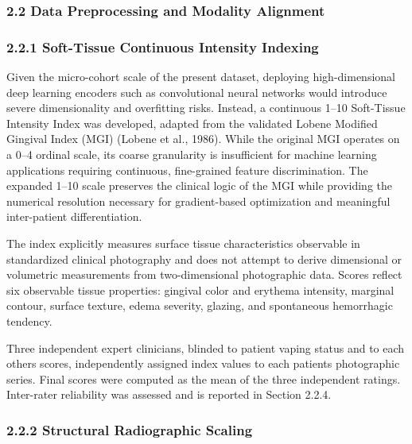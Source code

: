 \documentclass[
]{article}
\begin{document}
\subsubsection{\texorpdfstring{\textbf{2.2 Data Preprocessing and
Modality
Alignment}}{2.2 Data Preprocessing and Modality Alignment}}\label{data-preprocessing-and-modality-alignment}

\subsubsection{\texorpdfstring{\textbf{2.2.1 Soft-Tissue Continuous
Intensity
Indexing}}{2.2.1 Soft-Tissue Continuous Intensity Indexing}}\label{soft-tissue-continuous-intensity-indexing}

Given the micro-cohort scale of the present dataset, deploying
high-dimensional deep learning encoders such as convolutional neural
networks would introduce severe dimensionality and overfitting risks.
Instead, a continuous 1--10 Soft-Tissue Intensity Index was developed,
adapted from the validated Lobene Modified Gingival Index (MGI) (Lobene
et al., 1986). While the original MGI operates on a 0--4 ordinal scale,
its coarse granularity is insufficient for machine learning applications
requiring continuous, fine-grained feature discrimination. The expanded
1--10 scale preserves the clinical logic of the MGI while providing the
numerical resolution necessary for gradient-based optimization and
meaningful inter-patient differentiation.

The index explicitly measures surface tissue characteristics observable
in standardized clinical photography and does not attempt to derive
dimensional or volumetric measurements from two-dimensional photographic
data. Scores reflect six observable tissue properties: gingival color
and erythema intensity, marginal contour, surface texture, edema
severity, glazing, and spontaneous hemorrhagic tendency.

Three independent expert clinicians, blinded to patient vaping status
and to each other\textquotesingle s scores, independently assigned index
values to each patient\textquotesingle s photographic series. Final
scores were computed as the mean of the three independent ratings.
Inter-rater reliability was assessed and is reported in Section 2.2.4.

\subsubsection{\texorpdfstring{\textbf{2.2.2 Structural Radiographic
Scaling}}{2.2.2 Structural Radiographic Scaling}}\label{structural-radiographic-scaling}
\end{document}
